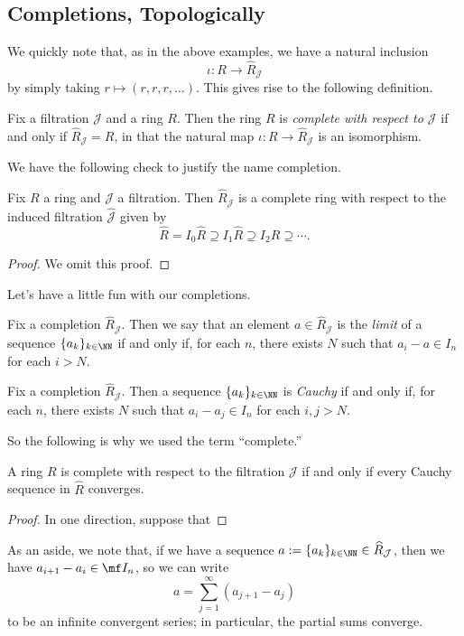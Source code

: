 \subsection{Completions, Topologically}
We quickly note that, as in the above examples, we have a natural inclusion
\[\iota:R\to\widehat R_\mathcal J\]
by simply taking $r\mapsto(r,r,r,\ldots)$. This gives rise to the following definition.
\begin{definition}[Complete]
	Fix a filtration $\mathcal J$ and a ring $R$. Then the ring $R$ is \textit{complete with respect to $\mathcal J$} if and only if $\widehat R_\mathcal J=R$, in that the natural map $\iota:R\to\widehat R_\mathcal J$ is an isomorphism.
\end{definition}
We have the following check to justify the name completion.
\begin{lemma}
	Fix $R$ a ring and $\mathcal J$ a filtration. Then $\widehat R_\mathcal J$ is a complete ring with respect to the induced filtration $\widehat{\mathcal J}$ given by
	\[\widehat R=I_0\widehat R\supseteq I_1\widehat R\supseteq I_2\widehat R\supseteq\cdots.\]
\end{lemma}
\begin{proof}
	We omit this proof.
\end{proof}

Let's have a little fun with our completions.
\begin{definition}[Limit]
	Fix a completion $\widehat R_\mathcal J$. Then we say that an element $a\in\widehat R_\mathcal J$ is the \textit{limit} of a sequence $\{a_k\}_{k\in\NN}$ if and only if, for each $n$, there exists $N$ such that $a_i-a\in I_n$ for each $i>N$.
\end{definition}
\begin{definition}
	Fix a completion $\widehat R_\mathcal J$. Then a sequence $\{a_k\}_{k\in\NN}$ is \textit{Cauchy} if and only if, for each $n$, there exists $N$ such that $a_i-a_j\in I_n$ for each $i,j>N$.
\end{definition}
So the following is why we used the term ``complete.''
\begin{lemma}
	A ring $R$ is complete with respect to the filtration $\mathcal J$ if and only if every Cauchy sequence in $\widehat R$ converges.
\end{lemma}
\begin{proof}
	In one direction, suppose that
\end{proof}
As an aside, we note that, if we have a sequence $a:=\{a_k\}_{k\in\NN}\in\widehat R_\mathcal J$, then we have $a_{i+1}-a_i\in\mf I_n$, so we can write
\[a=\sum_{j=1}^\infty(a_{j+1}-a_j)\]
to be an infinite convergent series; in particular, the partial sums converge.

